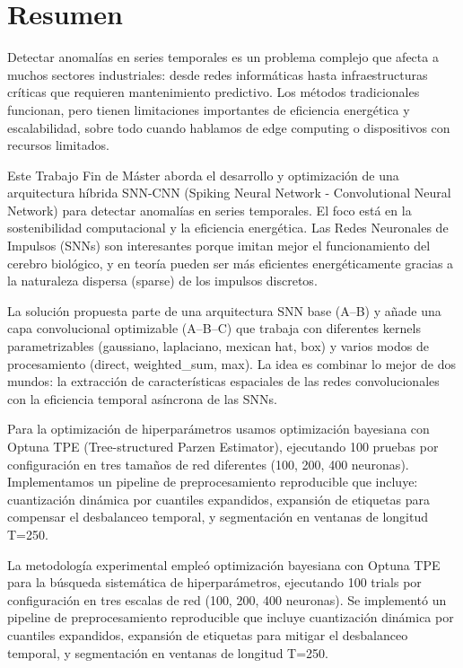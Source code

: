 \chapter*{Resumen}
\label{chap:resumen}


Detectar anomalías en series temporales es un problema complejo que afecta a muchos sectores industriales: desde redes informáticas hasta infraestructuras críticas que requieren mantenimiento predictivo. Los métodos tradicionales funcionan, pero tienen limitaciones importantes de eficiencia energética y escalabilidad, sobre todo cuando hablamos de edge computing o dispositivos con recursos limitados.

Este Trabajo Fin de Máster aborda el desarrollo y optimización de una arquitectura híbrida SNN-CNN (Spiking Neural Network - Convolutional Neural Network) para detectar anomalías en series temporales. El foco está en la sostenibilidad computacional y la eficiencia energética. Las Redes Neuronales de Impulsos (SNNs) son interesantes porque imitan mejor el funcionamiento del cerebro biológico, y en teoría pueden ser más eficientes energéticamente gracias a la naturaleza dispersa (sparse) de los impulsos discretos.

La solución propuesta parte de una arquitectura SNN base (A--B) y añade una capa convolucional optimizable (A--B--C) que trabaja con diferentes kernels parametrizables (gaussiano, laplaciano, mexican hat, box) y varios modos de procesamiento (direct, weighted\_sum, max). La idea es combinar lo mejor de dos mundos: la extracción de características espaciales de las redes convolucionales con la eficiencia temporal asíncrona de las SNNs.

Para la optimización de hiperparámetros usamos optimización bayesiana con Optuna TPE (Tree-structured Parzen Estimator), ejecutando 100 pruebas por configuración en tres tamaños de red diferentes (100, 200, 400 neuronas). Implementamos un pipeline de preprocesamiento reproducible que incluye: cuantización dinámica por cuantiles expandidos, expansión de etiquetas para compensar el desbalanceo temporal, y segmentación en ventanas de longitud T=250.

La metodología experimental empleó optimización bayesiana con Optuna TPE para la búsqueda sistemática de hiperparámetros, ejecutando 100 trials por configuración en tres escalas de red (100, 200, 400 neuronas). Se implementó un pipeline de preprocesamiento reproducible que incluye cuantización dinámica por cuantiles expandidos, expansión de etiquetas para mitigar el desbalanceo temporal, y segmentación en ventanas de longitud T=250.

